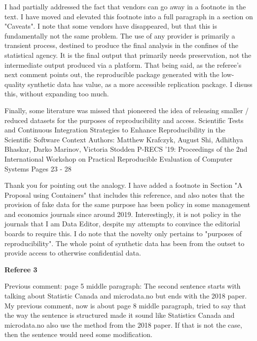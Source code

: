 \begin{response}
I had partially addressed the fact that vendors can go away in a footnote in the text. I have moved and elevated this footnote into a full paragraph in a section on "Caveats". I note that some vendors have disappeared, but that this is fundamentally not the same problem. The use of any provider is primarily a transient process, destined to produce the final analysis in the confines of the statistical agency. It is the final output that primarily needs preservation, not the intermediate output produced via a platform. That being said, as the referee's next comment points out, the reproducible package generated with the low-quality synthetic data has value, as a more accessible replication package. I disuss this, without expanding too much. 

\end{response}

\begin{referee}
    Finally, some literature was missed that pioneered the idea of releasing smaller / reduced datasets for
the purposes of reproducibility and access. Scientific Tests and Continuous Integration Strategies to
Enhance Reproducibility in the Scientific Software Context
Authors: Matthew Krafczyk, August Shi, Adhithya Bhaskar, Darko Marinov, Victoria Stodden
P-RECS '19: Proceedings of the 2nd International Workshop on Practical Reproducible Evaluation of
Computer Systems
Pages 23 - 28
\end{referee}

\begin{response}
    Thank you for pointing out the analogy. I have added a footnote in Section "A Proposal using Containers" that includes this reference, and also notes that the provision of fake data for the same purpose has been policy in some management and economics journals since around 2019. Interestingly, it is not policy in the journals that I am Data Editor, despite my attempts to convince the editorial boards to require this. I do note that the novelty only pertains to "purposes of reproducibility". The whole point of synthetic data has been from the outset \citep{rubin_discussion_1993} to provide access to otherwise confidential data.
\end{response}

\textbf{Referee 3}

\begin{referee}
    Previous comment: page 5 middle paragraph: The second sentence starts with talking about
Statistic Canada and microdata.no but ends with the 2018 paper. My previous comment, now is about
page 8 middle paragraph, tried to say that the way the sentence is structured made it sound like
Statistics Canada and microdata.no also use the method from the 2018 paper. If that is not the case,
then the sentence would need some modification.
\end{referee}

